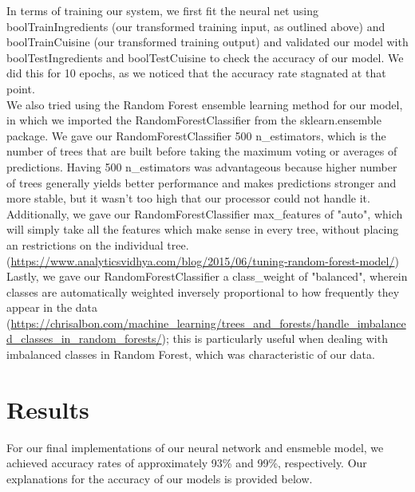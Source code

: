 \documentclass[11pt]{article}
\begin{document}
In terms of training our system, we first fit the neural net using boolTrainIngredients
(our transformed training input, as outlined above) and boolTrainCuisine (our
transformed training output) and validated our model with boolTestIngredients and boolTestCuisine
to check the accuracy of our model. We did this for 10 epochs, as we noticed that
the accuracy rate stagnated at that point. \\

We also tried using the Random Forest ensemble learning method for our model,
in which we imported the RandomForestClassifier from the sklearn.ensemble package.
We gave our RandomForestClassifier 500 n\_estimators, which is the number of trees
that are built before taking the maximum voting or averages of predictions. Having
500 n\_estimators was advantageous because higher number of trees generally yields
better performance and makes predictions stronger and more stable, but it wasn't
too high that our processor could not handle it. Additionally, we gave our
RandomForestClassifier max\_features of "auto", which will simply take all the
features which make sense in every tree, without placing an restrictions on
the individual tree. (\url{https://www.analyticsvidhya.com/blog/2015/06/tuning-random-forest-model/})
Lastly, we gave our RandomForestClassifier a class\_weight of "balanced", wherein
classes are automatically weighted inversely proportional to how frequently they
appear in the data (\url{https://chrisalbon.com/machine_learning/trees_and_forests/handle_imbalanced_classes_in_random_forests/});
this is particularly useful when dealing with imbalanced classes in Random Forest,
which was characteristic of our data. \\

\section{Results}

For our final implementations of our neural network and ensmeble model, we
achieved accuracy rates of approximately 93\% and 99\%, respectively. Our explanations for
the accuracy of our models is provided below. \\
\end{document}
